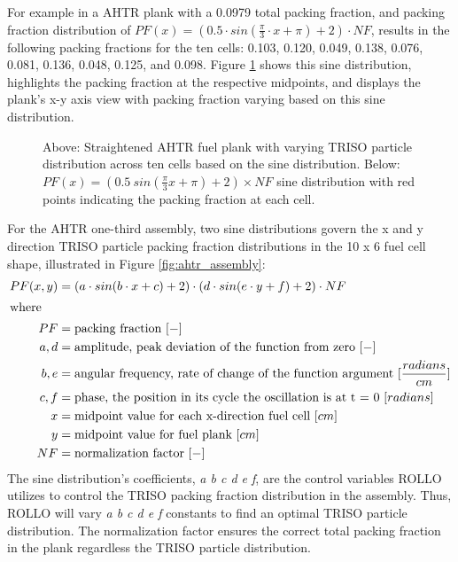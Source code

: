 For example in a \gls{AHTR} plank with a 0.0979 total packing fraction, and packing fraction 
distribution of $PF(x) = \left(0.5\cdot sin(\frac{\pi}{3}\cdot x + \pi) + 2\right)  \cdot NF$, 
results in the following packing fractions for the ten cells: 0.103, 0.120, 
0.049, 0.138, 0.076, 0.081, 0.136, 0.048, 0.125, and 0.098. 
Figure \ref{fig:triso_distribution} shows this sine distribution, highlights 
the packing fraction at the respective midpoints, and displays the plank's x-y 
axis view with packing fraction varying based on this sine distribution. 
\begin{figure}[]
    \centering
    \caption{Above: Straightened \acrfull{AHTR} fuel plank with varying \gls{TRISO} particle 
    distribution across ten cells based on the sine distribution. 
    Below: $PF(x) = (0.5\ sin(\frac{\pi}{3}x + \pi) + 2)  \times NF$ 
    sine distribution with red points indicating the packing fraction at each cell. }
    \label{fig:triso_distribution}
\end{figure}

For the \gls{AHTR} one-third assembly, two sine distributions govern the x and y direction
\gls{TRISO} particle packing fraction distributions in the 10 x 6 fuel cell shape, illustrated in 
Figure \ref{fig:ahtr_assembly}:
\begin{align}
    PF(x, y) &= \left(a\cdot sin(b\cdot x + c) + 2\right) 
    \cdot \left(d\cdot sin(e\cdot y + f) + 2\right) \cdot NF \\
    \intertext{where}
    PF &= \mbox{packing fraction } [-] \nonumber \\ 
    a, d &= \mbox{amplitude, peak deviation of the function from zero } [-] \nonumber \\
    b, e &= \mbox{angular frequency, rate of change of the function argument } [\frac{radians}{cm}] \nonumber \\
    c, f &= \mbox{phase, the position in its cycle the oscillation is at t = 0 } [radians]\nonumber \\
    x &= \mbox{midpoint value for each x-direction fuel cell } [cm]\nonumber \\
    y &= \mbox{midpoint value for fuel plank } [cm]\nonumber \\
    NF &= \mbox{normalization factor } [-]\nonumber
\end{align}
The sine distribution's coefficients, \textit{a b c d e f}, are the control variables \gls{ROLLO} 
utilizes to control the TRISO packing fraction distribution in the assembly.
Thus, \gls{ROLLO} will vary \textit{a b c d e f} constants to find an optimal TRISO particle 
distribution. 
The normalization factor ensures the correct total packing fraction 
in the plank regardless the \gls{TRISO} particle distribution.

